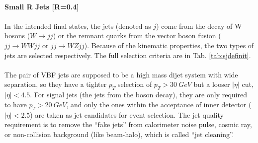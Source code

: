 \noindent
\\{\bf Small R Jets [R=0.4]}
\\
\\In the intended final states, the jets (denoted as $j$) come from the decay of W bosons ($W\to jj$) or the remnant quarks from the vector boson fusion ($jj\to WWjj$ or $jj \to WZjj$). Because of the kinematic properties, the two types of jets are selected respectively. The full selection criteria are in Tab. \ref{tab:sjdefinit}.
\\
\\The pair of VBF jets are supposed to be a high mass dijet system with wide separation, so they have a tighter $p_{T}$ selection of $p_{T}>30~GeV$ but a looser $|\eta|$ cut, $|\eta|<4.5$. For signal jets (the jets from the boson decay), they are only required to have $p_{T}>20~GeV$, and only the ones within the acceptance of inner detector ($|\eta|<2.5$) are taken as jet candidates for event selection. The jet quality requirement is to remove the ``fake jets'' from calorimeter noise pulse, cosmic ray, or non-collision background (like beam-halo), which is called ``jet cleaning''.

